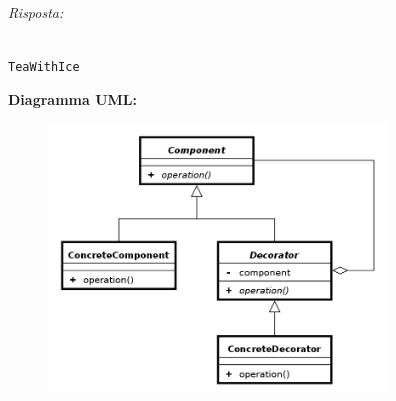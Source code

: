 \documentclass{article}
\newenvironment{solution}
    {\textit{Risposta:}}
    {}
\begin{document}
\begin{solution}
\begin{itemize}
\\
\texttt{TeaWithIce}
\end{itemize}
\textbf{Diagramma UML:}
\begin{figure}[htb!]
	\centering
	\label{ObserverPattern}
	\includegraphics[width=9cm]{./immagini/decoratorPattern.png}
\end{figure}
\end{solution}
\end{document}
